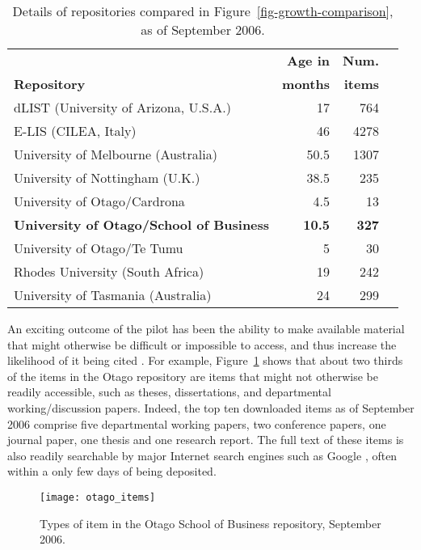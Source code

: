 \documentclass[12pt,pdftex,a4paper,titlepage]{article}
\begin{document}
\begin{table}
	\caption{Details of repositories compared in Figure~\ref{fig-growth-comparison}, as of September 2006.}
	\label{tab-repositories}
	\begin{center}
		\begin{tabular}{lrrl}
															&	\textbf{Age in}	&	\textbf{Num.}	\\
			\textbf{Repository}								&	\textbf{months}	&	\textbf{items}	\\
			\hline
			dLIST (University of Arizona, U.S.A.)			&	17				&	764	\\
			E-LIS (CILEA, Italy)							&	46				&	4278	\\
			University of Melbourne (Australia)				&	50.5			&	1307	\\
			University of Nottingham (U.K.)					&	38.5			&	235	\\
			University of Otago/Cardrona					&	4.5				&	13	\\
			\textbf{University of Otago/School of Business}	&	\textbf{10.5}	&	\textbf{327}	\\
			University of Otago/Te Tumu						&	5				&	30	\\
			Rhodes University (South Africa)				&	19				&	242	\\
			University of Tasmania (Australia)				&	24				&	299	\\
		\end{tabular}
	\end{center}
\end{table}


An exciting outcome of the pilot has been the ability to make available material that might otherwise be difficult or impossible to access, and thus increase the likelihood of it being cited \cite{Harn-S-2005-research,Hajj-C-2005-citation}. For example, Figure~\ref{fig-item-types} shows that about two thirds of the items in the Otago repository are items that might not otherwise be readily accessible, such as theses, dissertations, and departmental working/discussion papers. Indeed, the top ten downloaded items as of September 2006 comprise five departmental working papers, two conference papers, one journal paper, one thesis and one research report. The full text of these items is also readily searchable by major Internet search engines such as Google \cite{Sale-A-2006-OAchapter}, often within a only few days of being deposited.


\begin{figure}
	\centering
	\texttt{[image: otago\_items]}
	\caption{Types of item in the Otago School of Business repository, September 2006.}
	\label{fig-item-types}
\end{figure}
\end{document}
